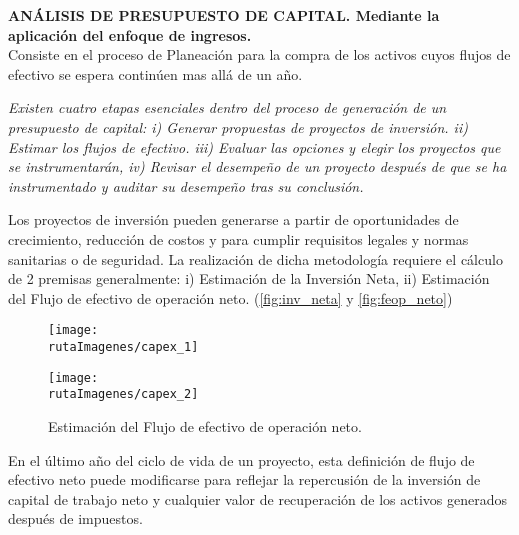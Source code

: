 \textcolor{principal}{\textbf{AN\'ALISIS DE PRESUPUESTO DE CAPITAL. Mediante la aplicaci\'on del enfoque de ingresos.} }\\

Consiste en el proceso de Planeaci\'on para la compra de los activos cuyos flujos de efectivo se espera contin\'uen mas all\'a de un a\~no.\\

\begin{center}
\begin{minipage}{8cm}
\textit{Existen cuatro etapas esenciales dentro del proceso de generaci\'on de un presupuesto de capital: i) Generar propuestas de proyectos de inversi\'on. ii) Estimar los flujos de efectivo. iii) Evaluar las opciones y elegir los proyectos que se instrumentarán, iv) Revisar el desempe\~no de un proyecto despu\'es de que se ha instrumentado y auditar su desempe\~no tras su conclusi\'on.}
\end{minipage}
\end{center}

Los proyectos de inversi\'on pueden generarse a partir de oportunidades de crecimiento, reducci\'on de costos y para cumplir requisitos legales y normas sanitarias o de seguridad.  La realizaci\'on de dicha metodolog\'ia requiere el c\'alculo de 2 premisas generalmente: i) Estimación de la Inversi\'on Neta, ii) Estimaci\'on del Flujo de efectivo de operaci\'on neto. (\autoref{fig:inv_neta} y \autoref{fig:feop_neto})

\begin{figure}[H]
\centering
\begin{minipage}{8cm}
\caption{Elementos de la Inversi\'on neta\label{fig:inv_neta}}
\texttt{[image: \\rutaImagenes/capex\_1]}
\end{minipage}
\quad
\begin{minipage}{8cm}
\caption{Estimaci\'on del Flujo de efectivo de operaci\'on neto.\label{fig:feop_neto}}
\texttt{[image: \\rutaImagenes/capex\_2]}\\
\end{minipage}
\end{figure}

En el \'ultimo a\~no del ciclo de vida de un proyecto, esta definici\'on de flujo de efectivo neto puede modificarse para reflejar la repercusi\'on de la inversi\'on de capital de trabajo neto y cualquier valor de recuperaci\'on de los activos generados despu\'es de impuestos.
